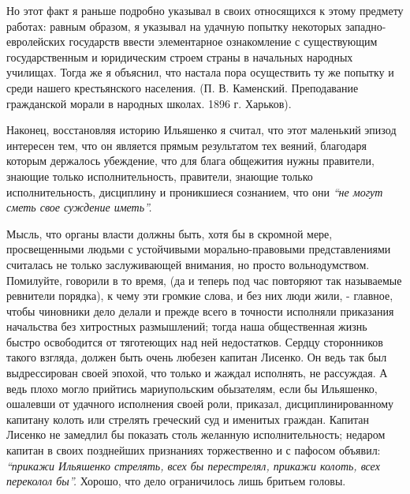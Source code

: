 \documentclass[a4paper,20pt]{article}
\begin{document}
Но этот факт я раньше подробно указывал в своих относящихся к этому предмету работах:
равным образом, я указывал на удачную попытку некоторых
западно-евролейских государств ввести элементарное ознакомление с существующим
государственным и юридическим
строем страны в начальных народных училищах. Тогда
же я объяснил, что настала пора осуществить ту же попытку и среди нашего крестьянского населения.
(П. В. Каменский. Преподавание гражданской морали в народных
школах. 1896 г. Харьков).

Наконец, восстановляя историю Ильяшенко я считал,
что этот маленький эпизод интересен тем, что он является прямым результатом 
тех веяний, благодаря которым держалось убеждение, 
что для блага общежития нужны правители, знающие только исполнительность,
правители, знающие только исполнительность, дисциплину и
проникшиеся сознанием, что они \emph{``не могут сметь свое суждение иметь''.}

Мысль, что органы власти должны быть, хотя бы в
скромной мере, просвещенными людьми с устойчивыми морально-правовыми
представлениями считалась не только заслуживающей внимания, 
но просто вольнодумством. Помилуйте, говорили в то время, 
(да и теперь под час повторяют
так называемые ревнители порядка), к чему эти громкие слова,
и без них люди жили, - главное, чтобы чиновники
дело делали и прежде всего в точности исполняли приказания 
начальства без хитростных размышлений; тогда наша
общественная жизнь быстро освободится от тяготеющих над ней недостатков.
Сердцу сторонников такого взгляда, должен быть очень любезен капитан Лисенко.
Он ведь так был выдрессирован своей эпохой, что только и жаждал исполнять, не
рассуждая. А ведь плохо могло прийтись мариупольским обызателям, если бы
Ильяшенко, ошалевши от удачного исполнения своей роли, приказал,
дисциплинированному капитану колоть или стрелять греческий суд и именитых
граждан.  Капитан Лисенко не замедлил бы показать столь желанную
исполнительность; недаром капитан в своих позднейших признаниях торжественно и
с пафосом объявил: \emph{``прикажи Ильяшенко стрелять, всех бы перестрелял,
прикажи колоть, всех переколол бы''.} Хорошо, что дело ограничилось лишь
бритьем головы.
\end{document}
